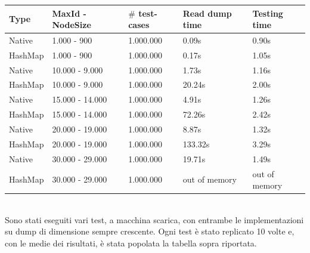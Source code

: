 \begin{tabular}{|l|l|l|l|l|}
    \hline
    \textbf{Type}    &   \textbf{MaxId - NodeSize}   &   \textbf{$\#$ test-cases}   &   \textbf{Read dump time}  &   \textbf{Testing time}            \\      
    \hline
    Native              &   1.000 - 900              &   1.000.000                  &   0.09s               &   0.90s                       \\
    HashMap             &   1.000 - 900              &   1.000.000                  &   0.17s               &   1.05s                       \\         
    \hline
    Native              &   10.000 - 9.000           &   1.000.000                  &   1.73s               &   1.16s                       \\
    HashMap             &   10.000 - 9.000           &   1.000.000                  &   20.24s              &   2.00s                       \\ 
    \hline
    Native              &   15.000 - 14.000          &   1.000.000                  &   4.91s               &   1.26s                       \\
    HashMap             &   15.000 - 14.000          &   1.000.000                  &   72.26s              &   2.42s                       \\ 
    \hline
    Native              &   20.000 - 19.000          &   1.000.000                  &   8.87s               &   1.32s                       \\
    HashMap             &   20.000 - 19.000          &   1.000.000                  &   133.32s             &   3.29s                       \\ 
    \hline
    Native              &   30.000 - 29.000          &   1.000.000                  &   19.71s              &   1.49s                       \\
    HashMap             &   30.000 - 29.000          &   1.000.000                  &   out of memory       &   out of memory               \\
    \hline                                    
\end{tabular}\\

Sono stati eseguiti vari test, a macchina scarica, con entrambe le implementazioni su dump di dimensione sempre crescente. 
Ogni test è stato replicato 10 volte e, con le medie dei risultati, è stata popolata la tabella sopra riportata.

